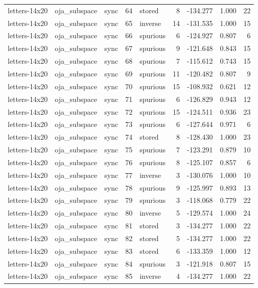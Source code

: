 \begin{tabular}{lllrlrrrr}
letters-14x20 & oja\_subspace & sync & 64 & stored & 8 & -134.277 & 1.000 & 22 \\
letters-14x20 & oja\_subspace & sync & 65 & inverse & 14 & -131.535 & 1.000 & 15 \\
letters-14x20 & oja\_subspace & sync & 66 & spurious & 6 & -124.927 & 0.807 & 6 \\
letters-14x20 & oja\_subspace & sync & 67 & spurious & 9 & -121.648 & 0.843 & 15 \\
letters-14x20 & oja\_subspace & sync & 68 & spurious & 7 & -115.612 & 0.743 & 15 \\
letters-14x20 & oja\_subspace & sync & 69 & spurious & 11 & -120.482 & 0.807 & 9 \\
letters-14x20 & oja\_subspace & sync & 70 & spurious & 15 & -108.932 & 0.621 & 12 \\
letters-14x20 & oja\_subspace & sync & 71 & spurious & 6 & -126.829 & 0.943 & 12 \\
letters-14x20 & oja\_subspace & sync & 72 & spurious & 15 & -124.511 & 0.936 & 23 \\
letters-14x20 & oja\_subspace & sync & 73 & spurious & 6 & -127.644 & 0.971 & 6 \\
letters-14x20 & oja\_subspace & sync & 74 & stored & 8 & -128.430 & 1.000 & 23 \\
letters-14x20 & oja\_subspace & sync & 75 & spurious & 7 & -123.291 & 0.879 & 10 \\
letters-14x20 & oja\_subspace & sync & 76 & spurious & 8 & -125.107 & 0.857 & 6 \\
letters-14x20 & oja\_subspace & sync & 77 & inverse & 3 & -130.076 & 1.000 & 10 \\
letters-14x20 & oja\_subspace & sync & 78 & spurious & 9 & -125.997 & 0.893 & 13 \\
letters-14x20 & oja\_subspace & sync & 79 & spurious & 3 & -118.068 & 0.779 & 22 \\
letters-14x20 & oja\_subspace & sync & 80 & inverse & 5 & -129.574 & 1.000 & 24 \\
letters-14x20 & oja\_subspace & sync & 81 & stored & 3 & -134.277 & 1.000 & 22 \\
letters-14x20 & oja\_subspace & sync & 82 & stored & 5 & -134.277 & 1.000 & 22 \\
letters-14x20 & oja\_subspace & sync & 83 & stored & 6 & -133.359 & 1.000 & 12 \\
letters-14x20 & oja\_subspace & sync & 84 & spurious & 3 & -121.918 & 0.807 & 15 \\
letters-14x20 & oja\_subspace & sync & 85 & inverse & 4 & -134.277 & 1.000 & 22 \\

\end{tabular}
